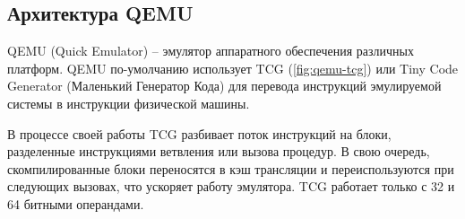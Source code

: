 %
%
%
%
%
%
%



\subsection{Архитектура QEMU}\label{sec:ch1/sec4/sub2/sub1}

QEMU (Quick Emulator) -- эмулятор аппаратного обеспечения различных платформ.
QEMU по-умолчанию использует TCG \cite{tcg} (\cref{fig:qemu-tcg}) или Tiny Code Generator (Маленький Генератор Кода) для
перевода инструкций эмулируемой системы в инструкции физической машины.

В процессе своей работы TCG разбивает поток инструкций на блоки, разделенные инструкциями
ветвления или вызова процедур.
В свою очередь, скомпилированные блоки переносятся в кэш трансляции и переиспользуются при следующих
вызовах, что ускоряет работу эмулятора.
TCG работает только с 32 и 64 битными операндами.

